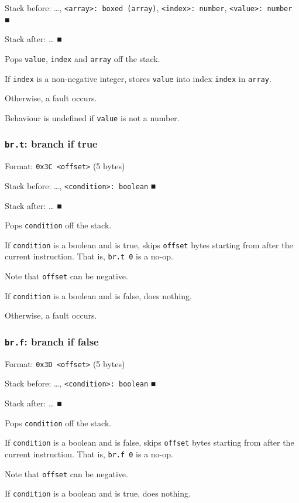 \documentclass[11pt]{article}
\begin{document}
Stack before: \ldots{}​, \texttt{<array>: boxed (array)}, \texttt{<index>: number},
\texttt{<value>: number} ■

Stack after: \ldots{}​ ■

Pops \texttt{value}, \texttt{index} and \texttt{array} off the stack.

If \texttt{index} is a non-negative integer, stores \texttt{value} into index \texttt{index}
in \texttt{array}.

Otherwise, a fault occurs.

Behaviour is undefined if \texttt{value} is not a number.

\subsubsection{\texttt{br.t}: branch if true}
\label{sec:orge20199f}
Format: \texttt{0x3C <offset>} (5 bytes)

Stack before: \ldots{}​, \texttt{<condition>: boolean} ■

Stack after: \ldots{}​ ■

Pops \texttt{condition} off the stack.

If \texttt{condition} is a boolean and is true, skips \texttt{offset} bytes starting
from after the current instruction. That is, \texttt{br.t 0} is a no-op.

Note that \texttt{offset} can be negative.

If \texttt{condition} is a boolean and is false, does nothing.

Otherwise, a fault occurs.

\subsubsection{\texttt{br.f}: branch if false}
\label{sec:org6c72b12}
Format: \texttt{0x3D <offset>} (5 bytes)

Stack before: \ldots{}​, \texttt{<condition>: boolean} ■

Stack after: \ldots{}​ ■

Pops \texttt{condition} off the stack.

If \texttt{condition} is a boolean and is false, skips \texttt{offset} bytes starting
from after the current instruction. That is, \texttt{br.f 0} is a no-op.

Note that \texttt{offset} can be negative.

If \texttt{condition} is a boolean and is true, does nothing.
\end{document}
